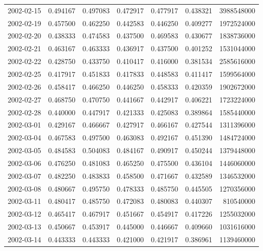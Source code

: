 \begin{tabular}{lrrrrrr}
2002-02-15 &    0.494167 &    0.497083 &    0.472917 &    0.477917 &    0.438321 &  3988548000 \\
2002-02-19 &    0.457500 &    0.462250 &    0.442583 &    0.446250 &    0.409277 &  1972524000 \\
2002-02-20 &    0.438333 &    0.474583 &    0.437500 &    0.469583 &    0.430677 &  1838736000 \\
2002-02-21 &    0.463167 &    0.463333 &    0.436917 &    0.437500 &    0.401252 &  1531044000 \\
2002-02-22 &    0.428750 &    0.433750 &    0.410417 &    0.416000 &    0.381534 &  2585616000 \\
2002-02-25 &    0.417917 &    0.451833 &    0.417833 &    0.448583 &    0.411417 &  1599564000 \\
2002-02-26 &    0.458417 &    0.466250 &    0.446250 &    0.458333 &    0.420359 &  1902672000 \\
2002-02-27 &    0.468750 &    0.470750 &    0.441667 &    0.442917 &    0.406221 &  1723224000 \\
2002-02-28 &    0.440000 &    0.447917 &    0.421333 &    0.425083 &    0.389864 &  1585440000 \\
2002-03-01 &    0.429167 &    0.466667 &    0.427917 &    0.466167 &    0.427544 &  1311396000 \\
2002-03-04 &    0.467583 &    0.497500 &    0.463083 &    0.492167 &    0.451390 &  1484724000 \\
2002-03-05 &    0.484583 &    0.504083 &    0.484167 &    0.490917 &    0.450244 &  1379448000 \\
2002-03-06 &    0.476250 &    0.481083 &    0.465250 &    0.475500 &    0.436104 &  1446060000 \\
2002-03-07 &    0.482250 &    0.483833 &    0.458500 &    0.471667 &    0.432589 &  1346532000 \\
2002-03-08 &    0.480667 &    0.495750 &    0.478333 &    0.485750 &    0.445505 &  1270356000 \\
2002-03-11 &    0.480417 &    0.485750 &    0.472083 &    0.480083 &    0.440307 &   810540000 \\
2002-03-12 &    0.465417 &    0.467917 &    0.451667 &    0.454917 &    0.417226 &  1255032000 \\
2002-03-13 &    0.450667 &    0.453917 &    0.445000 &    0.446667 &    0.409660 &  1031616000 \\
2002-03-14 &    0.443333 &    0.443333 &    0.421000 &    0.421917 &    0.386961 &  1139460000 \\

\end{tabular}
